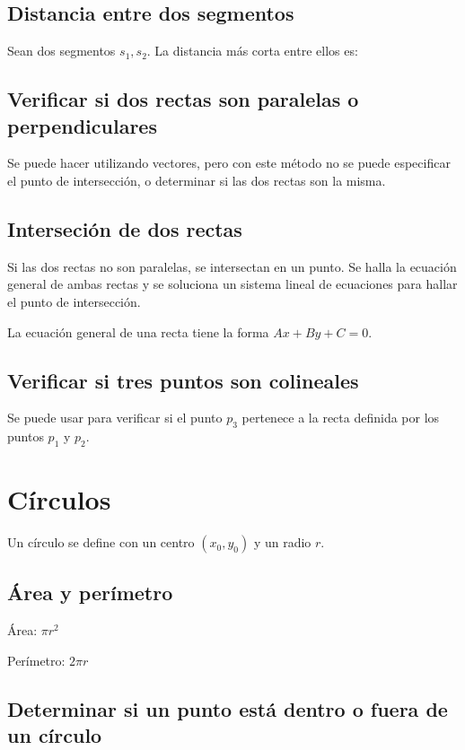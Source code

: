 \documentclass{article}
\begin{document}
\begin{multicols}{2}
\subsection{Distancia entre dos segmentos}
Sean dos segmentos \(s_1, s_2 \). La distancia más corta entre ellos es:
	 

\subsection{Verificar si dos rectas son paralelas o perpendiculares}
Se puede hacer utilizando vectores, pero con este método no se puede especificar el punto de intersección, o determinar si las dos rectas son la misma.


\subsection{Interseción de dos rectas}
Si las dos rectas no son paralelas, se intersectan en un punto. Se halla la ecuación general de ambas rectas y se soluciona un sistema lineal de ecuaciones para hallar el punto de intersección.

La ecuación general de una recta tiene la forma \( Ax+By+C=0 \).


\subsection{Verificar si tres puntos son colineales}
Se puede usar para verificar si el punto \( p_3 \) pertenece a la recta definida por los puntos \( p_1 \) y \( p_2 \).



\section{Círculos}
Un círculo se define con un centro \( (x_0, y_0) \) y un radio \( r \).

\subsection{Área y perímetro}
Área: \( \pi r^2 \)

Perímetro:  \( 2 \pi r \)

\subsection{Determinar si un punto está dentro o fuera de un círculo}



\end{multicols}
\end{document}
